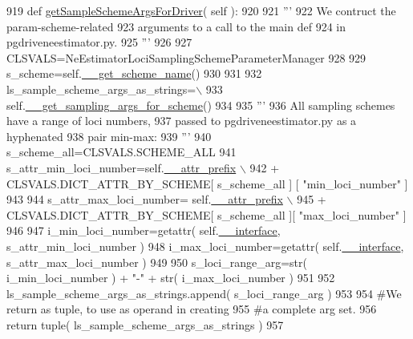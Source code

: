 \begin{DoxyCode}
919     \textcolor{keyword}{def }\hyperlink{classnegui_1_1pgutilityclasses_1_1NeEstimatorLociSamplingSchemeParameterManager_aee83e064c6363bad53e22be63ac24487}{getSampleSchemeArgsForDriver}( self ):
920 
921         \textcolor{stringliteral}{'''}
922 \textcolor{stringliteral}{        We contruct the param-scheme-related}
923 \textcolor{stringliteral}{        arguments to a call to the main def}
924 \textcolor{stringliteral}{        in pgdriveneestimator.py.  }
925 \textcolor{stringliteral}{        '''}
926 
927         CLSVALS=NeEstimatorLociSamplingSchemeParameterManager
928 
929         s\_scheme=self.\hyperlink{classnegui_1_1pgutilityclasses_1_1NeEstimatorLociSamplingSchemeParameterManager_a9d86dcb2900099be09b0310a5b987dec}{\_\_get\_scheme\_name}()
930 
931     
932         ls\_sample\_scheme\_args\_as\_strings=\(\backslash\)
933                     self.\hyperlink{classnegui_1_1pgutilityclasses_1_1NeEstimatorLociSamplingSchemeParameterManager_abbef002aa42ecd8dbf495ea64e3b1ef9}{\_\_get\_sampling\_args\_for\_scheme}()
934 
935         \textcolor{stringliteral}{'''}
936 \textcolor{stringliteral}{        All sampling schemes have a range of loci numbers,}
937 \textcolor{stringliteral}{        passed to pgdriveneestimator.py as a hyphenated}
938 \textcolor{stringliteral}{        pair min-max:}
939 \textcolor{stringliteral}{        '''}
940         s\_scheme\_all=CLSVALS.SCHEME\_ALL
941         s\_attr\_min\_loci\_number=self.\hyperlink{classnegui_1_1pgutilityclasses_1_1NeEstimatorLociSamplingSchemeParameterManager_afcab6e5ad53959295c0578ccc635f9cb}{\_\_attr\_prefix} \(\backslash\)
942                 + CLSVALS.DICT\_ATTR\_BY\_SCHEME[ s\_scheme\_all ] [ \textcolor{stringliteral}{"min\_loci\_number"} ]
943 
944         s\_attr\_max\_loci\_number= self.\hyperlink{classnegui_1_1pgutilityclasses_1_1NeEstimatorLociSamplingSchemeParameterManager_afcab6e5ad53959295c0578ccc635f9cb}{\_\_attr\_prefix} \(\backslash\)
945                 + CLSVALS.DICT\_ATTR\_BY\_SCHEME[ s\_scheme\_all ][ \textcolor{stringliteral}{"max\_loci\_number"} ]
946     
947         i\_min\_loci\_number=getattr( self.\hyperlink{classnegui_1_1pgutilityclasses_1_1NeEstimatorLociSamplingSchemeParameterManager_a1fe9113d08f24a9ae682195cd470852d}{\_\_interface}, s\_attr\_min\_loci\_number )
948         i\_max\_loci\_number=getattr( self.\hyperlink{classnegui_1_1pgutilityclasses_1_1NeEstimatorLociSamplingSchemeParameterManager_a1fe9113d08f24a9ae682195cd470852d}{\_\_interface}, s\_attr\_max\_loci\_number )
949                         
950         s\_loci\_range\_arg=str( i\_min\_loci\_number ) + \textcolor{stringliteral}{"-"} + str( i\_max\_loci\_number )
951 
952         ls\_sample\_scheme\_args\_as\_strings.append( s\_loci\_range\_arg )
953 
954         \textcolor{comment}{#We return as tuple, to use as operand in creating}
955         \textcolor{comment}{#a complete arg set.}
956         \textcolor{keywordflow}{return} tuple( ls\_sample\_scheme\_args\_as\_strings )
957 
\end{DoxyCode}
